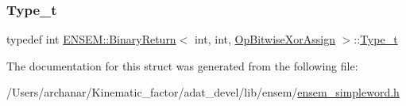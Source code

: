 \mbox{\label{structENSEM_1_1BinaryReturn_3_01int_00_01int_00_01OpBitwiseXorAssign_01_4_a8ee67fcadda1141739b4054917e9e3d2}} 
\subsubsection{\texorpdfstring{Type\_t}{Type\_t}\hspace{0.1cm}{\footnotesize\ttfamily [2/2]}}
{\footnotesize\ttfamily typedef int \mbox{\hyperlink{structENSEM_1_1BinaryReturn}{E\+N\+S\+E\+M\+::\+Binary\+Return}}$<$ int, int, \mbox{\hyperlink{structENSEM_1_1OpBitwiseXorAssign}{Op\+Bitwise\+Xor\+Assign}} $>$\+::\mbox{\hyperlink{structENSEM_1_1BinaryReturn_3_01int_00_01int_00_01OpBitwiseXorAssign_01_4_a8ee67fcadda1141739b4054917e9e3d2}{Type\+\_\+t}}}



The documentation for this struct was generated from the following file\+:\begin{DoxyCompactItemize}
\item 
/\+Users/archanar/\+Kinematic\+\_\+factor/adat\+\_\+devel/lib/ensem/\mbox{\hyperlink{lib_2ensem_2ensem__simpleword_8h}{ensem\+\_\+simpleword.\+h}}\end{DoxyCompactItemize}
